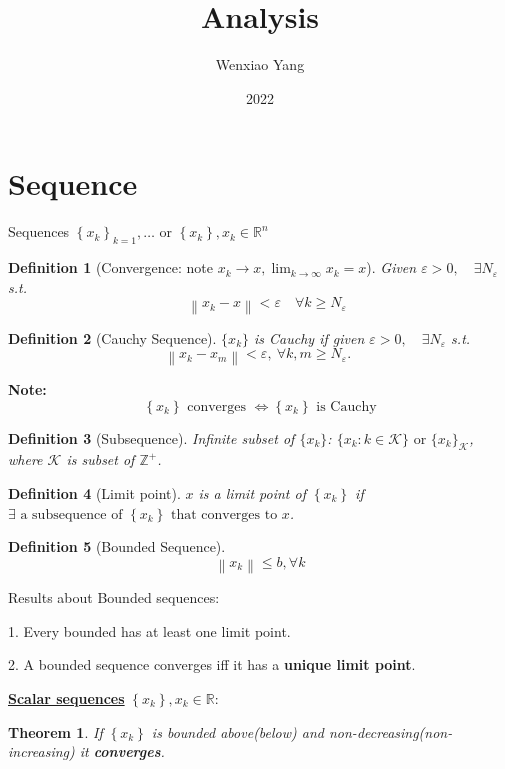 \documentclass[11pt,a4paper]{article}
\title{Analysis}
\author[*]{Wenxiao Yang}
\affil[*]{Department of Mathematics, University of Illinois at Urbana-Champaign}
\date{2022}
\newtheorem{theorem}{Theorem}
\newtheorem{definition}{Definition}
\begin{document}
\maketitle
\tableofcontents
\newpage

\section{Sequence}
Sequences $\left\{x_{k}\right\}_{k=1}, \ldots$ or $\left\{x_{k}\right\}, x_{k} \in \mathbb{R}^{n}$
\begin{definition}[Convergence: note $x_{k} \rightarrow x, \lim _{k \rightarrow \infty} x_{k}=x$]
    Given $\varepsilon>0, \quad \exists N_{\varepsilon}$ s.t. $$\quad\left\|x_{k}-x\right\|<\varepsilon \quad \forall k \geqslant N_{\varepsilon}$$
\end{definition}

\begin{definition}[Cauchy Sequence]
    $\{x_k\}$ is Cauchy if given $\varepsilon>0, \quad \exists N_{\varepsilon}$ s.t.
    $$\left\|x_{k}-x_{m}\right\|<\varepsilon,\  \forall k, m \geqslant N_{\varepsilon} \text {. }$$
\end{definition}
\textbf{Note:}$$\left\{x_{k}\right\} \text { converges } \Longleftrightarrow\left\{x_{k}\right\} \text { is Cauchy}$$

\begin{definition}[Subsequence]
Infinite subset of $\{x_k\}$: $\{x_k:k\in \mathcal{K} \}\text{ or } \{x_k\}_\mathcal{K} $, where $\mathcal{K} $ is subset of $\mathbb{Z}^+$.
\end{definition}

\begin{definition}[Limit point]
$x$ is a limit point of $\left\{x_{k}\right\}$ if $\exists \text { a subsequence of }\left\{x_{k}\right\} \text { that converges to } x$.
\end{definition}

\begin{definition}[Bounded Sequence]
    $$\left\|x_{k}\right\| \leqslant b, \forall k$$
\end{definition}

Results about Bounded sequences:

1. Every bounded has at least one limit point.

2. A bounded sequence converges iff it has a \textbf{unique limit point}.

\textbf{\underline{Scalar sequences}} $\left\{x_{k}\right\}, x_{k} \in \mathbb{R}$:
\begin{theorem}
    If $\left\{x_{k}\right\}$ is bounded above(below) and non-decreasing(non-increasing) it \textbf{converges}.
\end{theorem}
\end{document}
